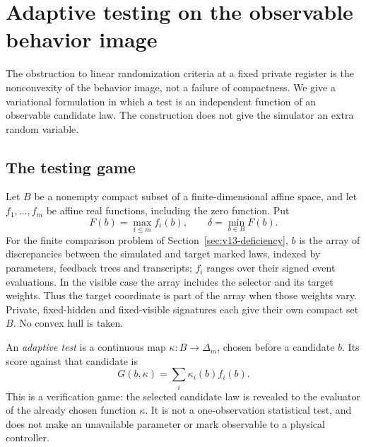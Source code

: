 \section{Adaptive testing on the observable behavior image}
\label{sec:v17-adaptive}

The obstruction to linear randomization criteria at a fixed private
register is the nonconvexity of the behavior image, not a failure of
compactness. We give a variational formulation in which a test is an
independent function of an observable candidate law. The construction
does not give the simulator an extra random variable.

\subsection{The testing game}
Let $B$ be a nonempty compact subset of a finite-dimensional affine
space, and let $f_1,\ldots,f_m$ be affine real functions, including the
zero function. Put
\[
 F(b)=\max_{i\le m}f_i(b),\qquad \delta=\min_{b\in B}F(b).
\]
For the finite comparison problem of Section~\ref{sec:v13-deficiency},
$b$ is the array of discrepancies between the simulated and target
marked laws, indexed by parameters, feedback trees and transcripts;
$f_i$ ranges over their signed event evaluations. In the visible case
the array includes the selector and its target weights. Thus the target
coordinate is part of the array when those weights vary. Private,
fixed-hidden and fixed-visible signatures each give their own compact
set $B$. No convex hull is taken.

An \emph{adaptive test} is a continuous map $\kappa:B\to\Delta_m$,
chosen before a candidate $b$. Its score against that candidate is
\[
 G(b,\kappa)=\sum_i\kappa_i(b)f_i(b).
\]
This is a verification game: the selected candidate law is revealed to
the evaluator of the already chosen function $\kappa$. It is not a
one-observation statistical test, and does not make an unavailable
parameter or mark observable to a physical controller.


